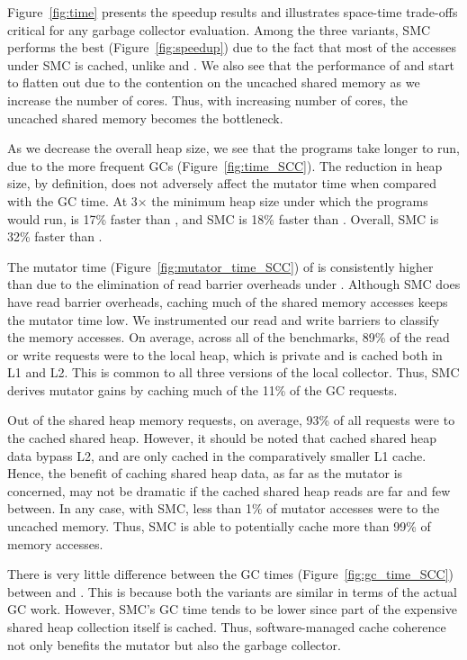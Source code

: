 Figure~\ref{fig:time} presents the speedup results and illustrates space-time
trade-offs critical for any garbage collector evaluation. Among the three
variants, SMC performs the best (Figure~\ref{fig:speedup}) due to the fact that
most of the accesses under SMC is cached, unlike \lc and \prc. We also see that
the performance of \lc and \prc start to flatten out due to the contention on the
uncached shared memory as we increase the number of cores. Thus, with
increasing number of cores, the uncached shared memory becomes the bottleneck.

As we decrease the overall heap size, we see that the programs take longer to
run, due to the more frequent GCs (Figure~\ref{fig:time_SCC}). The reduction in
heap size, by definition, does not adversely affect the mutator time when
compared with the GC time. At 3$\times$ the minimum heap size under which the
programs would run, \prc is 17\% faster than \lc, and SMC is 18\% faster than
\prc. Overall, SMC is 32\% faster than \lc.

The mutator time (Figure~\ref{fig:mutator_time_SCC}) of \lc is consistently
higher than \prc due to the elimination of read barrier overheads under \prc.
Although SMC does have read barrier overheads, caching much of the shared
memory accesses keeps the mutator time low. We instrumented our read and write
barriers to classify the memory accesses. On average, across all of the
benchmarks, 89\% of the read or write requests were to the local heap, which is
private and is cached both in L1 and L2. This is common to all three versions
of the local collector. Thus, SMC derives mutator gains by caching much of the
11\% of the GC requests.

Out of the shared heap memory requests, on average, 93\% of all requests were
to the cached shared heap. However, it should be noted that cached shared heap
data bypass L2, and are only cached in the comparatively smaller L1 cache.
Hence, the benefit of caching shared heap data, as far as the mutator is
concerned, may not be dramatic if the cached shared heap reads are far and few
between. In any case, with SMC, less than 1\% of mutator accesses were to the
uncached memory. Thus, SMC is able to potentially cache more than 99\% of
memory accesses.

There is very little difference between the GC times
(Figure~\ref{fig:gc_time_SCC}) between \lc and \prc. This is because both the
variants are similar in terms of the actual GC work. However, SMC's GC time
tends to be lower since part of the expensive shared heap collection itself is
cached. Thus, software-managed cache coherence not only benefits the mutator
but also the garbage collector.

